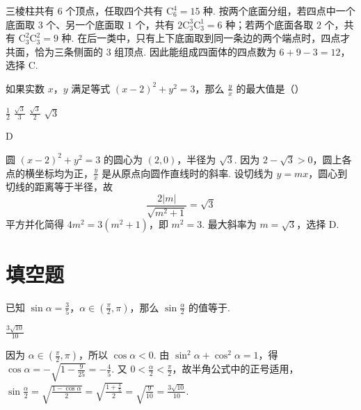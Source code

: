 \begin{solution}
三棱柱共有 \(6\) 个顶点，任取四个共有 \(\mathrm C_6^4=15\) 种. 按两个底面分组，若四点中一个底面取 \(3\) 个、另一个底面取 \(1\) 个，共有 \(2\mathrm C_3^3\mathrm C_3^1=6\) 种；若两个底面各取 \(2\) 个，共有 \(\mathrm C_3^2\mathrm C_3^2=9\) 种. 在后一类中，只有上下底面取到同一条边的两个端点时，四点才共面，恰为三条侧面的 \(3\) 组顶点. 因此能组成四面体的四点数为 \(6+9-3=12\)，选择 C.
\end{solution}

\begin{problem}
如果实数 \(x\)，\(y\) 满足等式 \((x-2)^2+y^2=3\)，那么 \(\frac{y}{x}\) 的最大值是（\quad）

\choices
    {\(\frac{1}{2}\)}
    {\(\frac{\sqrt{3}}{3}\)}
    {\(\frac{\sqrt{3}}{2}\)}
    {\(\sqrt{3}\)}
\end{problem}

\begin{answer}
D
\end{answer}

\begin{solution}
圆 \((x-2)^2+y^2=3\) 的圆心为 \((2,0)\)，半径为 \(\sqrt3\). 因为 \(2-\sqrt3>0\)，圆上各点的横坐标均为正，\(\frac{y}{x}\) 是从原点向圆作直线时的斜率. 设切线为 \(y=mx\)，圆心到切线的距离等于半径，故
\[
\frac{2|m|}{\sqrt{m^2+1}}=\sqrt3
\]
平方并化简得 \(4m^2=3(m^2+1)\)，即 \(m^2=3\). 最大斜率为 \(m=\sqrt3\)，选择 D.
\end{solution}

\section{填空题}

\begin{problem}
已知 \(\sin\alpha=\frac{3}{5}\)，\(\alpha\in\left( \frac{\pi}{2},\pi \right)\)，那么 \(\sin \frac{\alpha}{2}\) 的值等于\fillinblank{}.
\end{problem}

\begin{answer}
\(\frac{3\sqrt{10}}{10}\)
\end{answer}

\begin{solution}
因为 \(\alpha\in\left(\frac{\pi}{2},\pi\right)\)，所以 \(\cos\alpha<0\). 由 \(\sin^2\alpha+\cos^2\alpha=1\)，得 \(\cos\alpha=-\sqrt{1-\frac{9}{25}}=-\frac45\). 又 \(0<\frac\alpha2<\frac\pi2\)，故半角公式中的正号适用，\(\sin\frac\alpha2=\sqrt{\frac{1-\cos\alpha}{2}}=\sqrt{\frac{1+\frac45}{2}}=\sqrt{\frac9{10}}=\frac{3\sqrt{10}}{10}\).
\end{solution}

